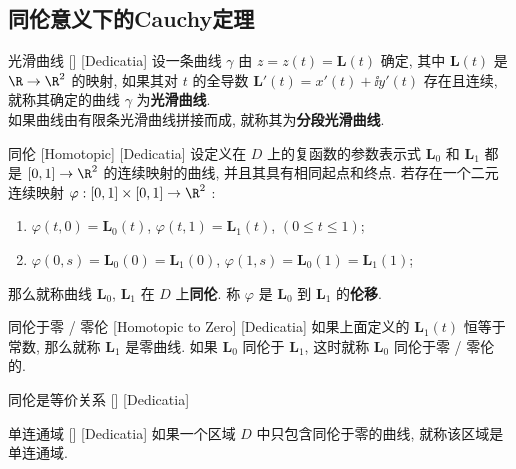 \documentclass[UTF8]{ctexart}
\begin{document}
    \subsection{同伦意义下的Cauchy定理}

        \begin{dfn}
            [UUID]
            {光滑曲线}
            []
            [Dedicatia]
            设一条曲线 \(\gamma\) 由 \(z=z(t)=\bm{L}(t)\) 确定, 其中 \(\bm{L}(t)\) 是 \(\R\to\R^2\) 的映射, 如果其对 \(t\) 的全导数 \(\bm{L}'(t)=x'(t)+\ii y'(t)\) 存在且连续, 就称其确定的曲线 \(\gamma\) 为\textbf{光滑曲线}. \\
            如果曲线由有限条光滑曲线拼接而成, 就称其为\textbf{分段光滑曲线}. 
        \end{dfn}

        \begin{dfn}
            [UUID]
            {同伦}
            [Homotopic]
            [Dedicatia]
            设定义在 \(D\) 上的复函数的参数表示式 \(\bm{L}_0\) 和 \(\bm{L}_1\) 都是 \([0,1]\to\R^2\) 的连续映射的曲线, 并且其具有相同起点和终点. 若存在一个二元连续映射 \(\varphi:[0,1]\times[0,1]\to\R^2\) :
            \begin{enumerate}
                \item  \(\varphi(t,0)=\bm{L}_0(t)\),  \(\varphi(t,1)=\bm{L}_1(t)\),  \((0\leq t\leq 1)\);
                \item  \(\varphi(0,s)=\bm{L}_0(0)=\bm{L}_1(0)\),  \(\varphi(1,s)=\bm{L}_0(1)=\bm{L}_1(1)\);
            \end{enumerate}
            那么就称曲线 \(\bm{L}_0\),  \(\bm{L}_1\) 在 \(D\) 上\textbf{同伦}. 称 \(\varphi\) 是 \(\bm{L}_0\) 到 \(\bm{L}_1\) 的\textbf{伦移}. 
        \end{dfn}

        \begin{dfn}
            [UUID]
            {同伦于零 / 零伦}
            [Homotopic to Zero]
            [Dedicatia]
            如果上面定义的 \(\bm{L}_1(t)\) 恒等于常数, 那么就称 \(\bm{L}_1\) 是零曲线. 如果 \(\bm{L}_0\) 同伦于 \(\bm{L}_1\), 这时就称 \(\bm{L}_0\) 同伦于零 / 零伦的. 
        \end{dfn}

        \begin{ppt}
            [UUID]
            {同伦是等价关系}
            []
            [Dedicatia]
        \end{ppt}
        
        \begin{dfn}
            [UUID]
            {单连通域}
            []
            [Dedicatia]
            如果一个区域 \(D\) 中只包含同伦于零的曲线, 就称该区域是单连通域. 
        \end{dfn}
\end{document}
